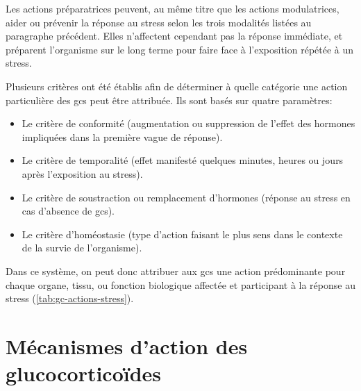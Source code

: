 \documentclass[../main.tex]{subfiles}
\begin{document}
		Les actions préparatrices peuvent, au même titre que les actions modulatrices, aider ou prévenir la réponse au stress selon les trois modalités listées au paragraphe précédent.
		Elles n'affectent cependant pas la réponse immédiate, et préparent l'organisme sur le long terme pour faire face à l'exposition répétée à un stress.
		\par
		Plusieurs critères ont été établis afin de déterminer à quelle catégorie une action particulière des \glspl{gc} peut être attribuée.
		Ils sont basés sur quatre paramètres:
		\begin{itemize}
			\item
				Le critère de conformité (augmentation ou suppression de l'effet des hormones impliquées dans la première vague de réponse).
			\item
				Le critère de temporalité (effet manifesté quelques minutes, heures ou jours après l'exposition au stress).
			\item
				Le critère de soustraction ou remplacement d'hormones (réponse au stress en cas d'absence de \glspl{gc}).
			\item
				Le critère d'homéostasie (type d'action faisant le plus sens dans le contexte de la survie de l'organisme).
		\end{itemize}
		Dans ce système, on peut donc attribuer aux \glspl{gc} une action prédominante pour chaque organe, tissu, ou fonction biologique affectée et participant à la réponse au stress (\autoref{tab:gc-actions-stress}).

		







\section{Mécanismes d'action des glucocorticoïdes}

\end{document}
